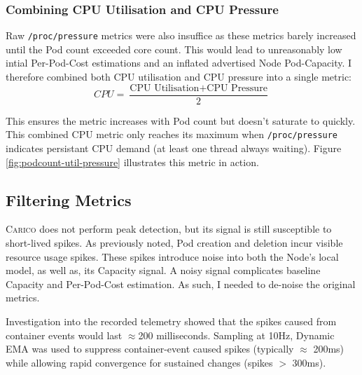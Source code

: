 \subsubsection{Combining CPU Utilisation and CPU Pressure}
Raw \verb|/proc/pressure| metrics were also insuffice as these metrics
barely increased until the Pod count exceeded core count. This would lead to
unreasonably low intial Per-Pod-Cost estimations and an inflated advertised Node
Pod-Capacity. I therefore combined both CPU utilisation and CPU pressure
into a single metric:
\[ CPU = \frac{\text{CPU Utilisation} + \text{CPU Pressure}}{2} \]

This ensures the metric increases with Pod count but doesn't saturate to
quickly. This combined CPU metric only reaches its maximum when \verb|/proc/pressure|
indicates persistant CPU demand (at least one thread always waiting). Figure
\ref{fig:podcount-util-pressure} illustrates this metric in action.

\subsection{Filtering Metrics}
\textsc{Carico} does not perform peak detection, but its signal is still
susceptible to short-lived spikes. As previously noted,  Pod creation and
deletion incur visible resource usage spikes. These spikes introduce noise
into both the Node's local model, as well as, its Capacity signal. A noisy
signal complicates baseline Capacity and Per-Pod-Cost estimation. As such, I
needed to de-noise the original metrics.

Investigation into the recorded telemetry showed that the spikes caused from
container events would last $\approx$200 milliseconds. Sampling at
10Hz, Dynamic EMA was used to suppress container-event caused spikes (typically
$\approx$ 200ms) while allowing rapid convergence for sustained changes (spikes
$>$ 300ms).


